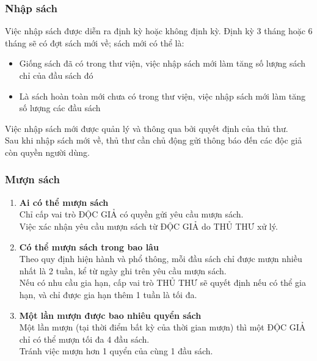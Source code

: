 \documentclass[12pt,a4paper]{report}
\begin{document}
			\subsubsection{Nhập sách}
			Việc nhập sách được diễn ra định kỳ hoặc không định kỳ. Định kỳ 3 tháng hoặc 6 tháng sẽ có đợt sách mới về; sách mới có thể là:
			\begin{itemize}
				\item Giống sách đã có trong thư viện, việc nhập sách mới làm tăng số lượng sách chỉ của đầu sách đó
				\item Là sách hoàn toàn mới chưa có trong thư viện, việc nhập sách mới làm tăng số lượng các đầu sách
			\end{itemize}
			Việc nhập sách mới được quản lý và thông qua bởi quyết định của thủ thư.\\
			Sau khi nhập sách mới về, thủ thư cần chủ động gửi thông báo đến các độc giả còn quyền người dùng.\\

			\subsubsection{Mượn sách}
				\begin{enumerate}
				\item \textbf{Ai có thể mượn sách}\\
				Chỉ cấp vai trò ĐỘC GIẢ có quyền gửi yêu cầu mượn sách.\\
				Việc xác nhận yêu cầu mượn sách từ ĐỘC GIẢ do THỦ THƯ xử lý.\\
				\item \textbf{Có thể mượn sách trong bao lâu}\\
				Theo quy định hiện hành và phổ thông, mỗi đầu sách chỉ được mượn nhiều nhất là 2 tuần, kể từ ngày ghi trên yêu cầu mượn sách.\\
				Nếu có nhu cầu gia hạn, cấp vai trò THỦ THƯ sẽ quyết định nếu có thể gia hạn, và chỉ được gia hạn thêm 1 tuần là tối đa.\\
				\item \textbf{Một lần mượn được bao nhiêu quyển sách}\\
				Một lần mượn (tại thời điểm bất kỳ của thời gian mượn) thì một ĐỘC GIẢ chỉ có thể mượn tối đa 4 đầu sách.\\
				Tránh việc mượn hơn 1 quyển của cùng 1 đầu sách.\\
				\end{enumerate}
\end{document}
